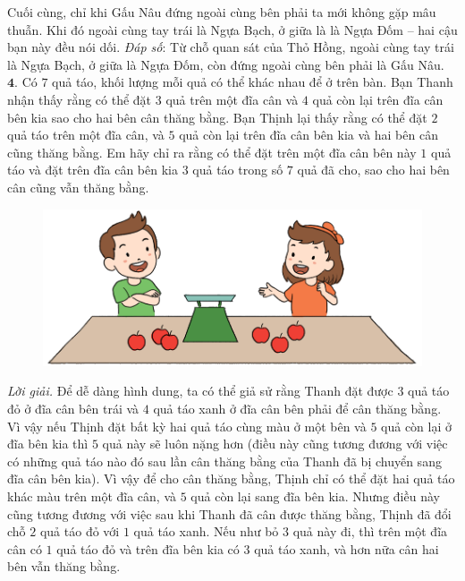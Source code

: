\begin{multicols}{2}
\begin{figure}[H]
		\vspace*{-15pt}
	\end{figure}
	Cuối cùng, chỉ khi Gấu Nâu đứng ngoài cùng bên phải ta mới không gặp mâu thuẫn. Khi đó ngoài cùng tay trái là Ngựa Bạch, ở giữa là là Ngựa Đốm -- hai cậu bạn này đều nói dối.
	\vskip 0.1cm
	\textit{Đáp số}: Từ chỗ quan sát của Thỏ Hồng, ngoài cùng tay trái là Ngựa Bạch, ở giữa là Ngựa Đốm, còn đứng ngoài cùng bên phải là Gấu Nâu.
	\vskip 0.1cm
	$\pmb{4.}$ Có $7$ quả táo, khối lượng mỗi quả có thể khác nhau để ở trên bàn. Bạn Thanh nhận thấy rằng có thể đặt $3$ quả trên một đĩa cân và $4$ quả còn lại trên đĩa cân bên kia sao cho hai bên cân thăng bằng. Bạn Thịnh lại thấy rằng có thể đặt $2$ quả táo trên một đĩa cân, và $5$ quả còn lại trên đĩa cân bên kia và hai bên cân cũng thăng bằng. Em hãy chỉ ra rằng có thể đặt trên một đĩa cân bên này $1$ quả táo và đặt trên đĩa cân bên kia $3$ quả táo trong số $7$ quả đã cho, sao cho hai bên cân cũng vẫn thăng bằng.
	\begin{figure}[H]
		\centering
		\vspace*{-5pt}
		\captionsetup{labelformat= empty, justification=centering}
		\includegraphics[width=1\linewidth]{Pi9_bai4}
		\vspace*{-15pt}
	\end{figure}
	\textit{Lời giải.} 	Để dễ dàng hình dung, ta có thể giả sử rằng Thanh đặt được $3$ quả táo đỏ ở đĩa cân bên trái và $4$ quả táo xanh ở đĩa cân bên phải để cân thăng bằng. Vì vậy nếu Thịnh đặt bất kỳ hai quả táo cùng màu ở một bên và $5$ quả còn lại ở đĩa bên kia thì $5$ quả này sẽ luôn nặng hơn (điều này cũng tương đương với việc có những quả táo nào đó sau lần cân thăng bằng của Thanh đã bị chuyển sang đĩa cân bên kia).
	\vskip 0.1cm
	Vì vậy để cho cân thăng bằng, Thịnh chỉ có thể đặt hai quả táo khác màu trên một đĩa cân, và $5$ quả còn lại sang đĩa bên kia. Nhưng điều này cũng tương đương với việc sau khi Thanh đã cân được thăng bằng, Thịnh đã đổi chỗ $2$ quả táo đỏ với $1$ quả táo xanh. Nếu như bỏ $3$ quả này đi, thì trên một đĩa cân có $1$ quả táo đỏ và trên đĩa bên kia có $3$ quả táo xanh, và hơn nữa cân hai bên vẫn thăng bằng.

\end{multicols}
